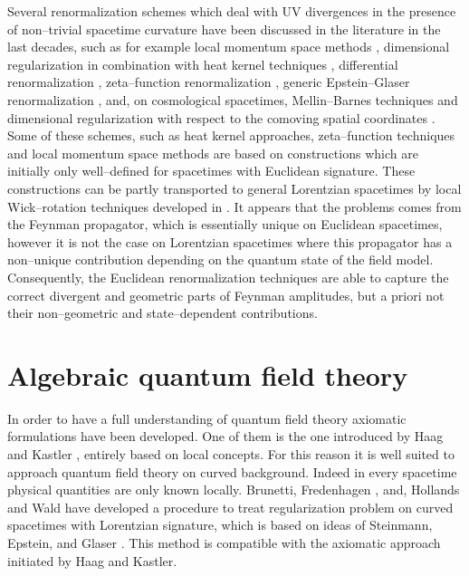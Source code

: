 \documentclass[11pt]{book}
\theoremstyle{break}
\begin{document}
Several renormalization schemes which deal with UV divergences in the presence of non--trivial spacetime curvature have been discussed in the literature in the last decades, such as for example local momentum space methods \cite{BUNCH_1981}, dimensional regularization in combination with heat kernel techniques \cite{LUSCHER_1982,TOMS_1982}, differential renormalization \cite{CHL_1995,PRANGE_1999}, zeta--function renormalization \cite{BILAL_2013}, generic Epstein--Glaser renormalization \cite{BF_2000,HW_2001,HW_2005}, and, on cosmological spacetimes, Mellin--Barnes techniques \cite{HOLLANDS_2010} and dimensional regularization with respect to the comoving spatial coordinates \cite{BCK_2010}. Some of these schemes, such as heat kernel approaches, zeta--function techniques and local momentum space methods  are based on constructions which are initially only well--defined for spacetimes with Euclidean signature. These constructions can be partly transported to general Lorentzian spacetimes by local Wick--rotation techniques developed in \cite{MORETTI_2000}. It appears that the problems comes from the Feynman propagator, which is essentially unique on Euclidean spacetimes, however it is not the case on Lorentzian spacetimes where this propagator has a non--unique contribution depending on the quantum state of the field model. Consequently, the Euclidean renormalization techniques are able to capture the correct divergent and geometric parts of Feynman amplitudes, but a priori not their non--geometric and state--dependent contributions.\par%


\section*{Algebraic quantum field theory}


In order to have a full understanding of quantum field theory axiomatic formulations have been developed. One of them is the one introduced by Haag and Kastler \cite{HK_1964}, entirely based on local concepts. For this reason it is well suited to approach quantum field theory on curved background. Indeed in every spacetime physical quantities are only known locally. Brunetti, Fredenhagen \cite{BF_2000}, and,  Hollands and Wald \cite{HW_2001,HW_2005} have developed a procedure to treat regularization problem on curved spacetimes with Lorentzian signature, which is based on ideas of Steinmann, Epstein, and Glaser \cite{STEINMANN_1971,EG_1973}. This method is compatible with the axiomatic approach initiated by Haag and Kastler.\par%
\end{document}

